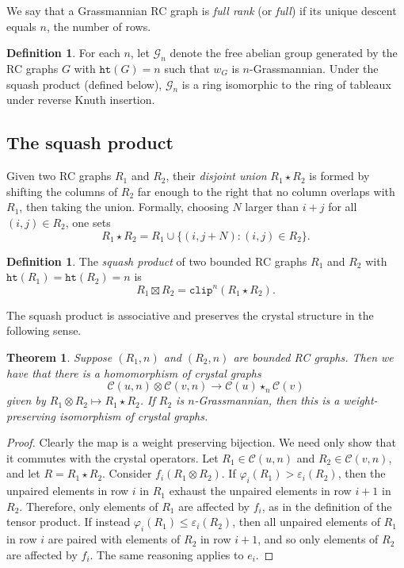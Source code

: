 \documentclass{amsart}
\newtheorem{theorem}{Theorem}[section]
\theoremstyle{definition}
\newtheorem{definition}[lemma]{Definition}
\theoremstyle{remark}
\numberwithin{equation}{section}
\newcommand{\grass}{\mathcal{G}}
\newcommand{\wof}[1]{w_{#1}}
\newcommand{\hr}{\mathtt{ht}}
\begin{document}
We say that a Grassmannian RC graph is \textit{full rank} (or \textit{full}) if its unique descent equals $n$, the number of rows.

\begin{definition}\label{definition:grassring}
For each $n$, let $\grass_n$ denote the free abelian group generated by the RC graphs $G$ with $\hr(G) = n$ such that $\wof{G}$ is $n$-Grassmannian.  Under the squash product (defined below), $\grass_n$ is a ring isomorphic to the ring of tableaux under reverse Knuth insertion.
\end{definition}

\subsection{The squash product}

Given two RC graphs $R_1$ and $R_2$, their \textit{disjoint union} $R_1 \star R_2$ is formed by shifting the columns of $R_2$ far enough to the right that no column overlaps with $R_1$, then taking the union.  Formally, choosing $N$ larger than $i + j$ for all $(i, j) \in R_2$, one sets
\[
R_1 \star R_2 = R_1 \cup \{(i, j + N) : (i, j) \in R_2\}.
\]

\begin{definition}\label{definition:squash}
The \textit{squash product} of two bounded RC graphs $R_1$ and $R_2$ with $\hr(R_1) = \hr(R_2) = n$ is
\[
R_1 \boxtimes R_2 = \mathtt{clip}^n(R_1 \star R_2).
\]
\end{definition}

The squash product is associative and preserves the crystal structure in the following sense.

\begin{theorem} \label{theorem:starproductcrystal}
  Suppose $(R_1,n)$ and $(R_2,n)$ are bounded RC graphs. Then we have that there is a homomorphism of crystal graphs
  $$\mathscr{C}(u,n)\otimes\mathscr{C}(v,n)\to \mathscr{C}(u) \star_n \mathscr{C}(v) $$
   given by $R_1\otimes R_2 \mapsto R_1\star R_2$. If $R_2$ is $n$-Grassmannian, then this is a weight-preserving isomorphism of crystal graphs.
\end{theorem}
\begin{proof}
Clearly the map is a weight preserving bijection. We need only show that it commutes with the crystal operators. Let $R_1\in \mathscr{C}(u,n)$ and $R_2\in \mathscr{C}(v,n)$, and let $R=R_1\star R_2$. Consider $f_i(R_1\otimes R_2)$. If $\varphi_i(R_1)>\varepsilon_i(R_2)$, then the unpaired elements in row $i$ in $R_1$ exhaust the unpaired elements in row $i+1$ in $R_2$. Therefore, only elements of $R_1$ are affected by $f_i$, as in the definition of the tensor product. If instead $\varphi_i(R_1)\leq \varepsilon_i(R_2)$, then all unpaired elements of $R_1$ in row $i$ are paired with elements of $R_2$ in row $i+1$, and so only elements of $R_2$ are affected by $f_i$. The same reasoning applies to $e_i$.
\end{proof}
\end{document}
